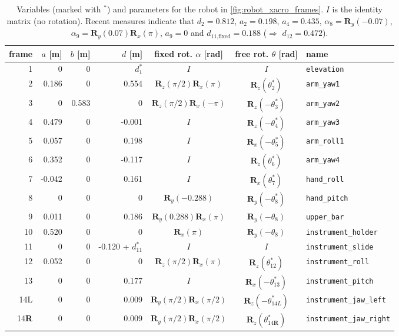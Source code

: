 \vspace{2mm}
\begin{table}[htbp]
\small
\centering
	\begin{tabular}{r | rrr c c l}\hline
		frame  & $a$ [m] & $b$ [m] & $d$ [m] & fixed rot. $\alpha$ [rad] & free rot. $\theta$ [rad] & name\\\hline
		1 & 0 & 0 & $d_1^*$ & $I$ & $I$ & \texttt{elevation}\\
		2 & 0.186 & 0 & 0.554 & $\textbf{R}_z(\pi/2)\textbf{R}_x(\pi)$ & $\textbf{R}_z(\theta_2^*)$ & \texttt{arm\_yaw1} \\
		3 & 0 & 0.583 & 0 & $\textbf{R}_z(\pi/2)\textbf{R}_x(-\pi)$ & $\textbf{R}_z(-\theta_3^*)$ & \texttt{arm\_yaw2} \\
		4 & 0.479 & 0 & -0.001 & $I$ & $\textbf{R}_z(-\theta_4^*)$ & \texttt{arm\_yaw3} \\
		5 & 0.057 & 0 & 0.198 & $I$ & $\textbf{R}_x(-\theta_5^*)$ & \texttt{arm\_roll1} \\
		6 & 0.352 & 0 & -0.117 & $I$ & $\textbf{R}_z(\theta_6^*)$ & \texttt{arm\_yaw4} \\
		7 & -0.042 & 0 & 0.161 & $I$ & $\textbf{R}_x(\theta_7^*)$ & \texttt{hand\_roll} \\
		8 & 0 & 0 & 0 & $\textbf{R}_y(-0.288)$ & $\textbf{R}_y(-\theta_8^*)$ & \texttt{hand\_pitch} \\
		9 & 0.011 & 0 & 0.186 & $\textbf{R}_y(0.288)\textbf{R}_x(\pi)$ & $\textbf{R}_y(-\theta_8)$ & \texttt{upper\_bar} \\
		10 & 0.520 & 0 & 0 & $\textbf{R}_x(\pi)$ & $\textbf{R}_y(-\theta_8)$ & \texttt{instrument\_holder} \\
		11 & 0 & 0 & -0.120 + $d_{11}^*$ & $I$ & $I$ & \texttt{instrument\_slide} \\
		12 & 0.052 & 0 & 0 & $\textbf{R}_z(\pi/2)\textbf{R}_x(\pi)$ & $\textbf{R}_z(\theta_{12}^*)$ & \texttt{instrument\_roll} \\
		13 & 0 & 0 & 0.177 & $I$ & $\textbf{R}_x(-\theta_{13}^*)$ & \texttt{instrument\_pitch} \\
		14L & 0 & 0 & 0.009 & $\textbf{R}_y(\pi/2)\textbf{R}_x(\pi/2)$ & $\textbf{R}_z(-\theta_{14L}^*)$ & \texttt{instrument\_jaw\_left} \\
		14\textbf{R} & 0 & 0 & 0.009 & $\textbf{R}_y(\pi/2)\textbf{R}_x(\pi/2)$ & $\textbf{R}_z(\theta_{14\textbf{R}}^*)$ & \texttt{instrument\_jaw\_right} \\
	\end{tabular}
	\caption{Variables (marked with $^*$) and parameters for the robot in \autoref{fig:robot_xacro_frames}. $I$ is the identity matrix (no rotation). Recent measures indicate that $d_2=0.812$, $a_2=0.198$, $a_4=0.435$, $\alpha_8=\textbf{R}_y(-0.07)$, $\alpha_9=\textbf{R}_y(0.07)\textbf{R}_x(\pi)$, $a_9=0$ and $d_\text{11,fixed}=0.188$ ($\Rightarrow$ $d_{12}=0.472$).}
	\label{tab:xacro_param}
\end{table}


